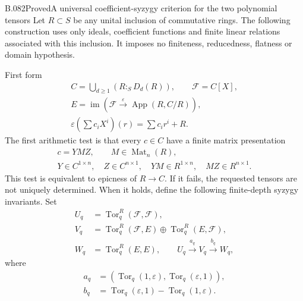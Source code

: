 \begin{saresult}{B.082}{Proved}{A universal coefficient-syzygy criterion for the two polynomial tensors}
Let $R\subset S$ be any unital inclusion of commutative rings. The
following construction uses only ideals, coefficient functions and
finite linear relations associated with this inclusion. It imposes
no finiteness, reducedness, flatness or domain hypothesis.

First form
\[
\begin{gathered}
 C=\bigcup_{d\ge1}(R:_S D_d(R)),\qquad \mathcal F=C[X],\\
 E=\operatorname{im}\left(\mathcal F\xrightarrow{\varepsilon}
                       \operatorname{App}(R,C/R)\right),\\
 \varepsilon\left(\sum c_iX^i\right)(r)=\sum c_ir^i+R.
\end{gathered}
                                                        \tag{B82.1}
\]
The first arithmetic test is that every $c\in C$ have a finite
matrix presentation
\[
\begin{gathered}
 c=Y M Z,\qquad M\in\operatorname{Mat}_{n}(R),\\
 Y\in C^{1\times n},\quad Z\in C^{n\times1},\quad
 YM\in R^{1\times n},\quad MZ\in R^{n\times1}.
\end{gathered}                                           \tag{B82.2}
\]
This test is equivalent to epicness of $R\to C$.
If it fails, the requested tensors are not uniquely determined.
When it holds, define the following finite-depth syzygy invariants.
Set
\[
\begin{aligned}
 U_q&=\operatorname{Tor}_q^R(\mathcal F,\mathcal F),\\
 V_q&=\operatorname{Tor}_q^R(\mathcal F,E)
                    \oplus\operatorname{Tor}_q^R(E,\mathcal F),\\
 W_q&=\operatorname{Tor}_q^R(E,E),\qquad
 U_q\xrightarrow{a_q}V_q\xrightarrow{b_q}W_q,
\end{aligned}                                           \tag{B82.3}
\]
where
\[
\begin{aligned}
 a_q&=(\operatorname{Tor}_q(1,\varepsilon),
                         \operatorname{Tor}_q(\varepsilon,1)),\\
 b_q&=\operatorname{Tor}_q(\varepsilon,1)
                        -\operatorname{Tor}_q(1,\varepsilon).
\end{aligned}
\]
\end{saresult}
